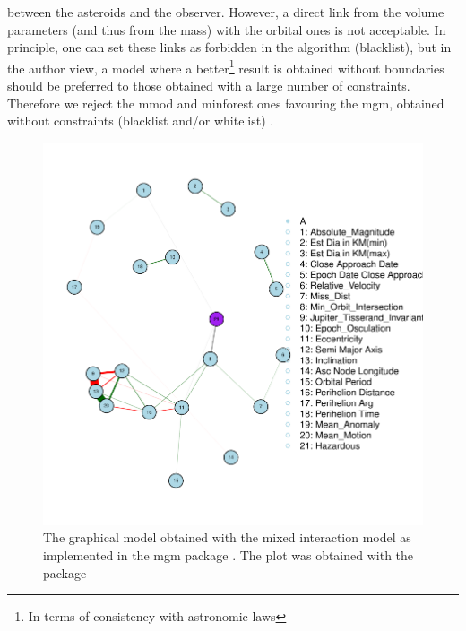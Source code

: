 \documentclass[12pt,%
               a4paper,%
               oneside,openany,%
               titlepage,%
               headinclude,footinclude,%
               BCOR5mm,%
               cleardoublepage=empty,%
               tablecaptionabove,%
               floatperchapter,
               ]{scrreprt}                 %
\begin{document}
between the asteroids and the observer.   However, a direct link from the volume parameters (and thus from the mass) with the orbital ones is not acceptable. In principle, one can set these links as forbidden in the algorithm (blacklist), but in the author view, a model where a better\footnote{In terms of consistency with astronomic laws} result is obtained without boundaries should be preferred to those obtained with a large number of constraints. Therefore we reject the mmod and minforest ones favouring the mgm, obtained without constraints (blacklist and/or whitelist) . 




\begin{figure}[h]
\begin{center}
\includegraphics[width=1\textwidth]{Figures/mgm.pdf}
\caption{The graphical model obtained with the mixed interaction model as implemented in the mgm package \cite{mgm,haslbeck2015mgm}. The plot was obtained with the \cite{qgraph} package}
\label{mgm}
\end{center}
\end{figure}
\end{document}
